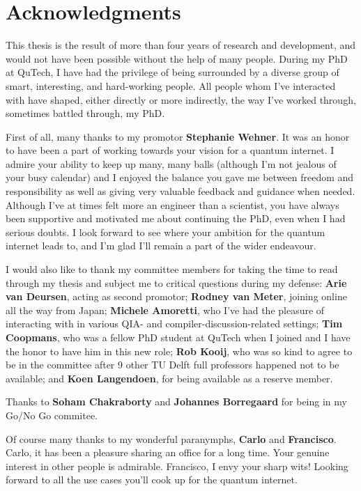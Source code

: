 \chapter*{Acknowledgments}

This thesis is the result of more than four years of research and development, and would not have been possible without the help of many people.
During my PhD at QuTech, I have had the privilege of being surrounded by a diverse group of smart, interesting, and hard-working people.
All people whom I've interacted with have shaped, either directly or more indirectly, the way I've worked through, sometimes battled through, my PhD.

First of all, many thanks to my promotor \textbf{Stephanie Wehner}.
It was an honor to have been a part of working towards your vision for a quantum internet.
I admire your ability to keep up many, many balls (although I'm not jealous of your busy calendar)
and I enjoyed the balance you gave me between freedom and responsibility as well as giving very valuable feedback and guidance when needed.
Although I've at times felt more an engineer than a scientist, you have always been supportive and motivated me about continuing the PhD, even when I had serious doubts.
I look forward to see where your ambition for the quantum internet leads to, and I'm glad I'll remain a part of the wider endeavour.

I would also like to thank my committee members for taking the time to read through my thesis and subject me to critical questions during my defense:
\textbf{Arie van Deursen}, acting as second promotor;
\textbf{Rodney van Meter}, joining online all the way from Japan;
\textbf{Michele Amoretti}, who I've had the pleasure of interacting with in various QIA- and compiler-discussion-related settings;
\textbf{Tim Coopmans}, who was a fellow PhD student at QuTech when I joined and I have the honor to have him in this new role;
\textbf{Rob Kooij}, who was so kind to agree to be in the committee after 9 other TU Delft full professors happened not to be available;
and \textbf{Koen Langendoen}, for being available as a reserve member.

Thanks to \textbf{Soham Chakraborty} and \textbf{Johannes Borregaard} for being in my Go/No Go commitee.

Of course many thanks to my wonderful paranymphs, \textbf{Carlo} and \textbf{Francisco}.
Carlo, it has been a pleasure sharing an office for a long time. Your genuine interest in other people is admirable.
Francisco, I envy your sharp wits! Looking forward to all the use cases you'll cook up for the quantum internet.

